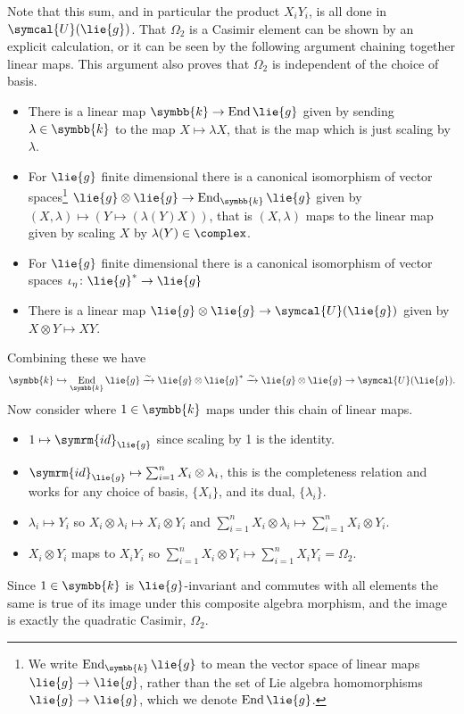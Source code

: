 \documentclass[fleqn]{NotesClass}
\renewcommand{\field}{\symbb{k}}
\newcommand{\id}{\symrm{id}}
\DeclareMathOperator{\End}{End}
\newcommand{\universalenveloping}{\symcal{U}}
\begin{document}
    Note that this sum, and in particular the product \(X_i Y_i\), is all done in \(\universalenveloping(\lie{g})\).
    That \(\Omega_2\) is a Casimir element can be shown by an explicit calculation, or it can be seen by the following argument chaining together linear maps.
    This argument also proves that \(\Omega_2\) is independent of the choice of basis.
    \begin{itemize}
        \item There is a linear map \(\field \to \End \lie{g}\) given by sending \(\lambda \in \field\) to the map \(X \mapsto \lambda X\), that is the map which is just scaling by \(\lambda\).
        \item For \(\lie{g}\) finite dimensional there is a canonical isomorphism of vector spaces\footnote{We write \(\End_{\field}\lie{g}\) to mean the vector space of linear maps \(\lie{g} \to \lie{g}\), rather than the set of Lie algebra homomorphisms \(\lie{g} \to \lie{g}\), which we denote \(\End\lie{g}\).} \(\lie{g} \otimes \lie{g} \to \End_{\field} \lie{g}\) given by \((X, \lambda) \mapsto (Y \mapsto (\lambda(Y)X))\), that is \((X, \lambda)\) maps to the linear map given by scaling \(X\) by \(\lambda(Y) \in \complex\).
        \item For \(\lie{g}\) finite dimensional there is a canonical isomorphism of vector spaces \(\iota_\eta \colon \lie{g}^* \to \lie{g}\)
        \item There is a linear map \(\lie{g} \otimes \lie{g} \to \universalenveloping(\lie{g})\) given by \(X \otimes Y \mapsto XY\).
    \end{itemize}
    Combining these we have
    \begin{equation}
        \field \hookrightarrow \End_{\field} \lie{g} \xrightarrow{\sim} \lie{g} \otimes \lie{g}^* \xrightarrow{\sim} \lie{g} \otimes \lie{g} \to \universalenveloping(\lie{g}).
    \end{equation}
    Now consider where \(1 \in \field\) maps under this chain of linear maps.
    \begin{itemize}
        \item \(1 \mapsto \id_{\lie{g}}\) since scaling by 1 is the identity.
        \item \(\id_{\lie{g}} \mapsto \sum_{i=1}^n X_i \otimes \lambda_i\), this is the completeness relation and works for any choice of basis, \(\{X_i\}\), and its dual, \(\{\lambda_i\}\).
        \item \(\lambda_i \mapsto Y_i\) so \(X_i \otimes \lambda_i \mapsto X_i \otimes Y_i\) and \(\sum_{i=1}^n X_i \otimes \lambda_i \mapsto \sum_{i=1}^n X_i \otimes Y_i\).
        \item \(X_i \otimes Y_i\) maps to \(X_i Y_i\) so \(\sum_{i=1}^n X_i \otimes Y_i \mapsto \sum_{i=1}^n X_i Y_i = \Omega_2\).
    \end{itemize}
    Since \(1 \in \field\) is \(\lie{g}\)-invariant and commutes with all elements the same is true of its image under this composite algebra morphism, and the image is exactly the quadratic Casimir, \(\Omega_2\).
    
\end{document}
